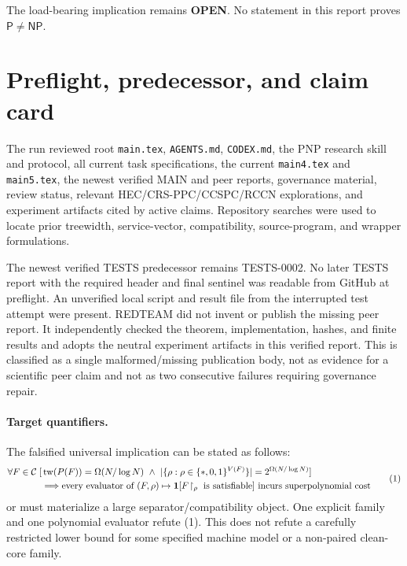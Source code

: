 \documentclass[11pt]{article}
\newcommand{\Status}[1]{\textbf{#1}}
\newcommand{\OPEN}{\Status{OPEN}}
\begin{document}
The load-bearing implication remains \OPEN. No statement in this report
proves \(\mathsf{P}\ne\mathsf{NP}\).

\section{Preflight, predecessor, and claim card}

The run reviewed root \texttt{main.tex}, \texttt{AGENTS.md},
\texttt{CODEX.md}, the PNP research skill and protocol, all current task
specifications, the current \texttt{main4.tex} and \texttt{main5.tex}, the
newest verified MAIN and peer reports, governance material, review status,
relevant HEC/CRS-PPC/CCSPC/RCCN explorations, and experiment artifacts cited by
active claims. Repository searches were used to locate prior treewidth,
service-vector, compatibility, source-program, and wrapper formulations.

The newest verified TESTS predecessor remains TESTS-0002. No later TESTS
report with the required header and final sentinel was readable from GitHub at
preflight. An unverified local script and result file from the interrupted
test attempt were present. REDTEAM did not invent or publish the missing peer
report. It independently checked the theorem, implementation, hashes, and
finite results and adopts the neutral experiment artifacts in this verified
report. This is classified as a single malformed/missing publication body,
not as evidence for a scientific peer claim and not as two consecutive
failures requiring governance repair.

\paragraph{Target quantifiers.}
The falsified universal implication can be stated as follows:
\[
\begin{split}
\forall F\in{\cal C}\;[
 &\operatorname{tw}(P(F))=\Omega(N/\log N)
 \ \wedge\ |\{\rho:\rho\in\{*,0,1\}^{V(F)}\}|=2^{\Omega(N/\log N)}
]\\
&\Longrightarrow
\text{every evaluator of }(F,\rho)\mapsto
\mathbf 1[F\!\upharpoonright_{\rho}\text{ is satisfiable}]
\text{ incurs superpolynomial cost}
\end{split}
\tag{1}
\]
or must materialize a large separator/compatibility object. One explicit
family and one polynomial evaluator refute (1). This does not refute a
carefully restricted lower bound for some specified machine model or a
non-paired clean-core family.
\end{document}
